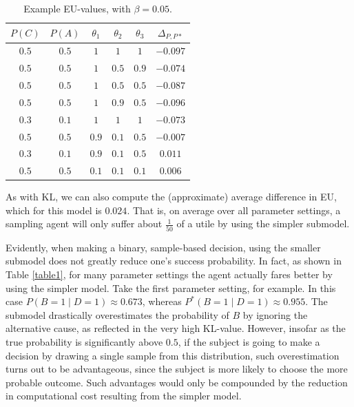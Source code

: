 \documentclass[10pt,letterpaper]{article}
\begin{document}
\begin{table}[h]  \begin{center}
\begin{tabular}{c | c | c | c | c || c}
 $P(C)$ & $P(A)$ & $\theta_1$ & $\theta_2$ & $\theta_3$ & $\Delta_{P,P*}$ \\ \hline
 $0.5$ & $0.5$ & $1$ & $1$ & $1$  & $-0.097$ \\
  $0.5$ & $0.5$ & $1$ & $0.5$ & $0.9$  & $-0.074$ \\
  $0.5$ & $0.5$ &$1$ & $0.5$ & $0.5$  & $-0.087$ \\
 $0.5$ & $0.5$ & $1$ & $0.9$ & $0.5$  & $-0.096$ \\
  $0.3$ & $0.1$ & $1$ & $1$ & $1$ & $-0.073$ \\
 $0.5$ & $0.5$ &  $0.9$ & $0.1$ & $0.5$  & $-0.007$ \\
  $0.3$ & $0.1$ & $0.9$ & $0.1$ & $0.5$ & $0.011$ \\
 $0.5$ & $0.5$ & $0.1$ & $0.1$ & $0.1$ & $0.006$ 
\end{tabular} \end{center} \caption{Example EU-values, with $\beta = 0.05$.} \label{table2}
\end{table}

 \noindent As with KL, we can also compute the (approximate) average difference in EU, which for this model is $0.024$. That is, on average over all parameter settings, a sampling agent will only suffer about $\frac{1}{50}$ of a utile by using the simpler submodel.

Evidently, when making a binary, sample-based decision, using the smaller submodel does not greatly reduce one's success probability. In fact, as shown in Table \ref{table1}, for many parameter settings the agent actually fares better by using the simpler model. Take the first parameter setting, for example. In this case $P(B=1\mid D=1) \approx 0.673$, whereas $P^*(B=1 \mid D=1) \approx 0.955$. The submodel drastically overestimates the probability of $B$ by ignoring the alternative cause, as reflected in the very high KL-value. However, insofar as the true probability is significantly above $0.5$, if the subject is going to make a decision by drawing a single sample from this distribution, such overestimation turns out to be advantageous, since the subject is more likely to choose the more probable outcome. Such advantages would only be compounded by the reduction in computational cost resulting from the simpler model.
\end{document}
